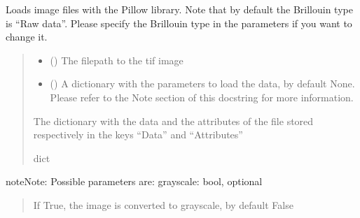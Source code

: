 \documentclass[letterpaper,10pt,english]{sphinxmanual}
\begin{document}
\begin{fulllineitems}
\label{\detokenize{_autosummary/HDF5_BLS.load_formats.load_image:HDF5_BLS.load_formats.load_image.load_image_base}}
\pysigstartsignatures
\pysiglinewithargsret
{}
{\sphinxparamcomma {}\sphinxparamcomma {}}
{}
\pysigstopsignatures
\sphinxAtStartPar
Loads image files with the Pillow library. Note that by default the Brillouin type is “Raw data”. Please specify the Brillouin type in the parameters if you want to change it.
\begin{quote}\begin{description}
\begin{itemize}
\item {} 
\sphinxAtStartPar
{} () \textendash{} The filepath to the tif image

\item {} 
\sphinxAtStartPar
{} (\sphinxstyleliteralemphasis{\sphinxupquote{, }}) \textendash{} A dictionary with the parameters to load the data, by default None. Please refer to the Note section of this docstring for more information.

\end{itemize}

\sphinxAtStartPar
The dictionary with the data and the attributes of the file stored respectively in the keys “Data” and “Attributes”

\sphinxAtStartPar
dict

\end{description}\end{quote}

\begin{sphinxadmonition}{note}{Note:}
\sphinxAtStartPar
Possible parameters are:
\sphinxhyphen{} grayscale: bool, optional
\begin{quote}

\sphinxAtStartPar
If True, the image is converted to grayscale, by default False
\end{quote}
\end{sphinxadmonition}

\end{fulllineitems}
\end{document}
